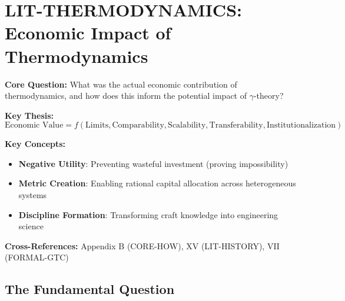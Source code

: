 \chapter{LIT-THERMODYNAMICS: Economic Impact of Thermodynamics}
\label{app:thermodynamics}

\begin{abstract}
This appendix documents how thermodynamics transformed the industrial economy
not by inventing machines, but by enabling plannable, scalable, and comparable
industrial systems. We identify five core economic functions with 25 historical
cases demonstrating each function. The central thesis: thermodynamics created
an \textit{investment, scaling, and comparison logic} that transformed craft
into engineering. The $\gamma$-theory of complementarity aims to provide an
analogous transformation for behavioral economics and AI systems.
\end{abstract}

\begin{tcolorbox}[colback=blue!5!white, colframe=blue!75!black,
    title=Quick Reference: Thermodynamics Economic Impact]

\textbf{Core Question:} What was the actual economic contribution of thermodynamics,
and how does this inform the potential impact of $\gamma$-theory?

\textbf{Key Thesis:}
\begin{equation}
\text{Economic Value} = f(\text{Limits}, \text{Comparability}, \text{Scalability}, \text{Transferability}, \text{Institutionalization})
\end{equation}

\textbf{Key Concepts:}
\begin{itemize}[nosep]
\item \textbf{Negative Utility}: Preventing wasteful investment (proving impossibility)
\item \textbf{Metric Creation}: Enabling rational capital allocation across heterogeneous systems
\item \textbf{Discipline Formation}: Transforming craft knowledge into engineering science
\end{itemize}

\textbf{Cross-References:} Appendix B (CORE-HOW), XV (LIT-HISTORY), VII (FORMAL-GTC)
\end{tcolorbox}


\section{The Fundamental Question}
\label{sec:thermo-fundamental}

